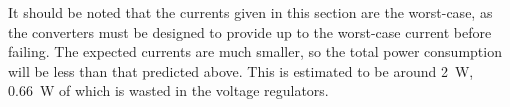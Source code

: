 It should be noted that the currents given in this section are the worst-case, as the converters must be designed to provide up to the worst-case current before failing. The expected currents are much smaller, so the total power consumption will be less than that predicted above. This is estimated to be around \SI{2}{\watt}, \SI{0.66}{\watt} of which is wasted in the voltage regulators.

